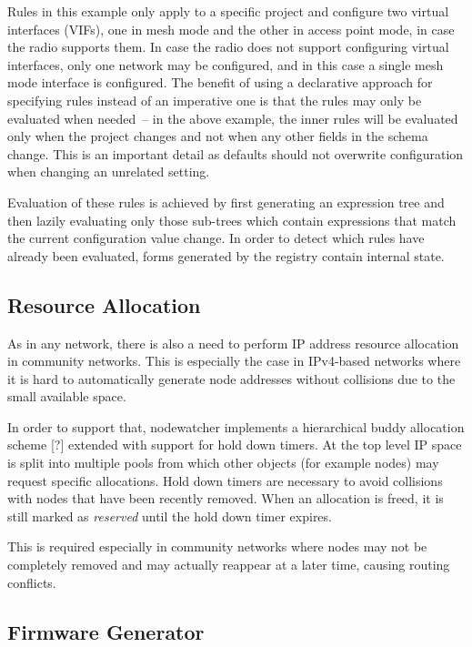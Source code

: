 \documentclass[5p,sort&compress]{elsarticle}
\begin{document}
Rules in this example only apply to a specific project and configure two virtual interfaces (VIFs), one in mesh mode and the other in access point mode, in case the radio supports them.
In case the radio does not support configuring virtual interfaces, only one network may be configured, and in this case a single mesh mode interface is configured.
The benefit of using a declarative approach for specifying rules instead of an imperative one is that the rules may only be evaluated when needed~-- in the above example, the inner rules will be evaluated only when the project changes and not when any other fields in the schema change.
This is an important detail as defaults should not overwrite configuration when changing an unrelated setting.

Evaluation of these rules is achieved by first generating an expression tree and then lazily evaluating only those sub-trees which contain expressions that match the current configuration value change.
In order to detect which rules have already been evaluated, forms generated by the registry contain internal state.

\subsection{Resource Allocation}

As in any network, there is also a need to perform IP address resource allocation in community networks.
This is especially the case in IPv4-based networks where it is hard to automatically generate node addresses without collisions due to the small available space.

In order to support that, nodewatcher implements a hierarchical buddy allocation scheme [?] extended with support for hold down timers.
At the top level IP space is split into multiple pools from which other objects (for example nodes) may request specific allocations.
Hold down timers are necessary to avoid collisions with nodes that have been recently removed.
When an allocation is freed, it is still marked as \textit{reserved} until the hold down timer expires.

This is required especially in community networks where nodes may not be completely removed and may actually reappear at a later time, causing routing conflicts.

\subsection{Firmware Generator}
\label{sec:firmware-generator}
\end{document}

